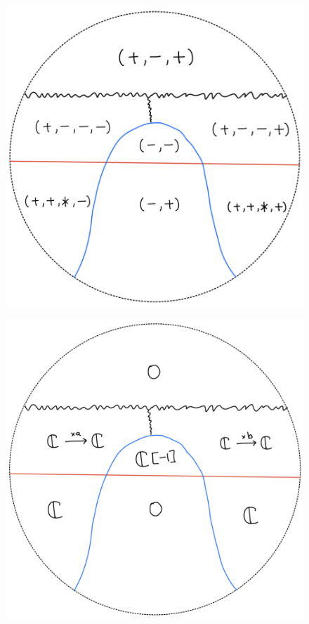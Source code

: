 \begin{figure}[H]
    \centering
    \includegraphics[scale = 0.95]{diagrams/lemma2/34.png} 
    \caption{}
    \label{fig:your-label}
\end{figure}
\begin{figure}[H]
    \centering
    \includegraphics[scale = 0.95]{diagrams/lemma2/35.png} 
    \caption{}
    \label{fig:your-label}
\end{figure}
